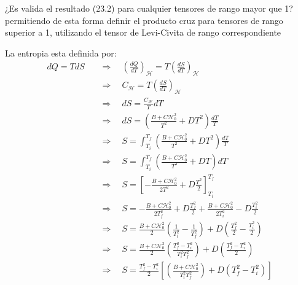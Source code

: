 \documentclass[a4paper]{article}
\begin{document}
\begin{answer}[Punto 23]
        ¿Es valida el resultado (23.2) para cualquier tensores de rango mayor que 1? 
        permitiendo de esta forma definir el producto cruz para tensores de rango superior a 1, utilizando el tensor de Levi-Civita de rango correspondiente

    \end{answer}





    
    \begin{answer}[Punto 10]
        La entropia esta definida por:
        \begin{align*}
            dQ = TdS \quad &\Rightarrow \quad \left( \frac{dQ}{dT}\right)_{\mathscr{H}} = T \left(\frac{dS}{dT}\right)_\mathscr{H}\\
            &\Rightarrow \quad C_{\mathscr{H}} = T \left(\frac{dS}{dT}\right)_{\mathscr{H}}\\
            &\Rightarrow \quad dS = \frac{C_{\mathscr{H}}}{T}dT\\
            &\Rightarrow \quad dS = \left(\frac{B+C \mathscr{H}_0^2}{T^2}+D T^2\right)\frac{dT}{T}\\
            &\Rightarrow \quad S = \int_{T_i}^{T_f} \left(\frac{B+C \mathscr{H}_0^2}{T^2}+D T^2\right)\frac{dT}{T}\\
            &\Rightarrow \quad S = \int_{T_i}^{T_f} \left(\frac{B+C \mathscr{H}_0^2}{T^3}+D T\right)dT\\
            &\Rightarrow \quad S = \left[-\frac{B+C \mathscr{H}_0^2}{2T^2}+D \frac{T^2}{2}\right]_{T_i}^{T_f}\\
            &\Rightarrow \quad S = -\frac{B+C \mathscr{H}_0^2}{2T_f^2}+D \frac{T_f^2}{2} + \frac{B+C \mathscr{H}_0^2}{2T_i^2}-D \frac{T_i^2}{2}\\
            &\Rightarrow \quad S = \frac{B+C \mathscr{H}_0^2}{2}\left(\frac{1}{T_i^2}-\frac{1}{T_f^2}\right)+D \left(\frac{T_f^2}{2} -\frac{T_i^2}{2}\right)\\
            &\Rightarrow \quad S = \frac{B+C \mathscr{H}_0^2}{2}\left(\frac{T_f^2 - T_i^2}{T_i^2T_f^2}\right)+D \left(\frac{T_f^2 - T_i^2}{2}\right)\\
            &\Rightarrow \quad S =\frac{T_f^2 - T_i^2}2\left[ \left(\frac{B+C \mathscr{H}_0^2}{T_i^2T_f^2}\right)+D \left(T_f^2 - T_i^2\right)\right]\\
        \end{align*}
    \end{answer}
\end{document}

